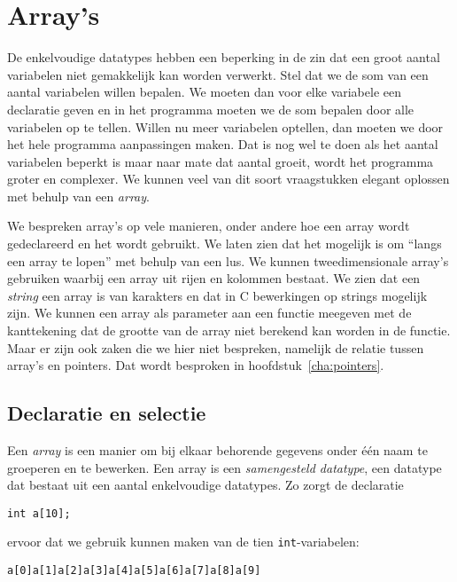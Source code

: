\chapter{Array's}
\label{cha:arrays}
\thispagestyle{empty}

De enkelvoudige datatypes hebben een beperking in de zin dat een groot aantal variabelen niet gemakkelijk kan worden verwerkt. Stel dat we de som van een aantal variabelen willen bepalen. We moeten dan voor elke variabele een declaratie geven en in het programma moeten we de som bepalen door alle variabelen op te tellen. Willen nu meer variabelen optellen, dan moeten we door het hele programma aanpassingen maken. Dat is nog wel te doen als het aantal variabelen beperkt is maar naar mate dat aantal groeit, wordt het programma groter en complexer. We kunnen veel van dit soort vraagstukken elegant oplossen met behulp van een \textsl{array}.

We bespreken array's op vele manieren, onder andere hoe een array wordt gedeclareerd en het wordt gebruikt. We laten zien dat het mogelijk is om ``langs een array te lopen'' met behulp van een lus. We kunnen tweedimensionale array's gebruiken waarbij een array uit rijen en kolommen bestaat. We zien dat een \textsl{string} een array is van karakters en dat in C bewerkingen op strings mogelijk zijn. We kunnen een array als parameter aan een functie meegeven met de kanttekening dat de grootte van de array niet berekend kan worden in de functie. Maar er zijn ook zaken die we hier niet bespreken, namelijk de relatie tussen array's en pointers. Dat wordt besproken in hoofdstuk~\ref{cha:pointers}.

\section{Declaratie en selectie}
Een \textsl{array} is een manier om bij elkaar behorende gegevens onder één naam te groeperen en te bewerken. Een array is een \textsl{samengesteld datatype}, een datatype dat bestaat uit een aantal enkelvoudige datatypes.
Zo zorgt de declaratie

\hspace*{1em}\texttt{int a[10];}

ervoor dat we gebruik kunnen maken van de tien \texttt{int}-variabelen:

\hspace*{1em}\texttt{a[0]}\quad\texttt{a[1]}\quad\texttt{a[2]}\quad\texttt{a[3]}\quad\texttt{a[4]}\quad\texttt{a[5]}\quad\texttt{a[6]}\quad\texttt{a[7]}\quad\texttt{a[8]}\quad\texttt{a[9]}

